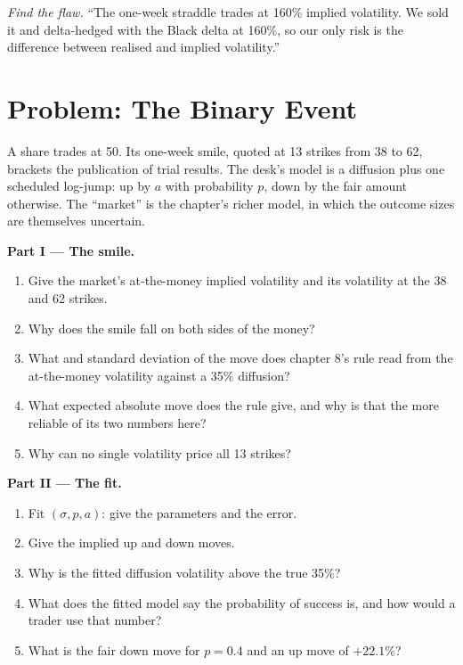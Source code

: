 \begin{exercise}[$\star\star\star$]\label{exo:dv:jumps-and-levy-models:8}
\emph{Find the flaw.} ``The one-week straddle trades at 160\% implied volatility. We sold it and delta-hedged with the
Black delta at 160\%, so our only risk is the difference between realised and implied volatility.''
\end{exercise}

\section{Problem: The Binary Event}

\begin{problem}\label{pb:dv:jumps-and-levy-models:1}
A share trades at 50. Its one-week smile, quoted at 13 strikes from 38 to 62, brackets the publication of trial
results. The desk's model is a diffusion plus one scheduled log-jump: up by $a$ with probability $p$, down by the
fair amount otherwise. The ``market'' is the chapter's richer model, in which the outcome sizes are themselves
uncertain.

\medskip\noindent\textbf{Part I --- The smile.}
\begin{enumerate}
\item Give the market's at-the-money implied volatility and its volatility at the 38 and 62 strikes.
\item Why does the smile fall on both sides of the money?
\item What  and standard deviation of the move does chapter 8's rule read from the at-the-money
volatility against a 35\% diffusion?
\item What expected absolute move does the rule give, and why is that the more reliable of its two numbers here?
\item Why can no single volatility price all 13 strikes?
\end{enumerate}

\medskip\noindent\textbf{Part II --- The fit.}
\begin{enumerate}[resume]
\item Fit $(\sigma,p,a)$: give the parameters and the error.
\item Give the implied up and down moves.
\item Why is the fitted diffusion volatility above the true 35\%?
\item What does the fitted model say the probability of success is, and how would a trader use that number?
\item What is the fair down move for $p=0.4$ and an up move of $+22.1\%$?
\end{enumerate}


\end{problem}

